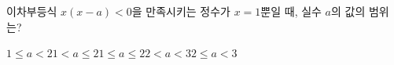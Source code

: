 이차부등식 $x(x-a)<0$을 만족시키는 정수가 $x=1$뿐일 때, 실수 $a$의 값의 범위는?
\begin{choicesii}{$1\le a<2$}{$1<a\le 2$}{$1\le a\le 2$}{$2<a<3$}{$2\le a<3$}\end{choicesii}
